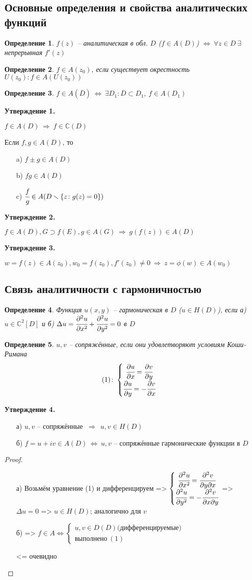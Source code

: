 \documentclass[draft]{report}
\newcommand{\dd}{\partial}
\newcommand{\then}{\ \Rightarrow\ }
\renewcommand{\C}{\mathbb{C}}
\newcommand{\LRA}{\Leftrightarrow}
\renewcommand{\bar}{\overline}
\renewcommand{\f}{\phi}
\newcommand{\D}{\Delta}
\newcommand{\sys}[1]{\left\{\begin{matrix}#1\end{matrix}\right.}
\newcommand{\opr}[1]{\begin{opred}#1\end{opred}}
\newtheorem*{opred}{Определение}
\theoremstyle{remark}
\begin{document}
\subsection{Основные определения и свойства аналитических функций}

\opr{$f(z)$ -- аналитическая в обл. $D$ ($f\in A(D)$) $\LRA\ \forall z\in D\ \exists$ непрерывная $f'(z)$ }
\opr{$f\in A(z_0)$, если существует окрестность $U(z_0)\colon f\in A(U(z_0))$}
\opr{$f\in A(\bar{D})\ \LRA\ \exists D_1\colon \bar{D}\subset D_1,\ f\in A(D_1)$}

{\bfseries Утверждение 1.}

$f\in A(D)\then f\in \C(D)$

Если $f,g\in A(D)$, то
\begin{itemize}
\item[a)] $f\pm g\in A(D)$
\item[b)] $fg \in A(D)$
\item[c)] $\cfrac fg \in A(D\smallsetminus\{z\colon g(z)=0\})$
\end{itemize}

{\bfseries Утверждение 2.}

$f\in A(D), G\supset f(E), g\in A(G)\then g(f(z))\in A(D)$

{\bfseries Утверждение 3.}

$w=f(z)\in A(z_0), w_0=f(z_0), f'(z_0)\neq 0 \then z=\f(w)\in A(w_0)$

\subsection{Связь аналитичности с гармоничностью}

\opr{Функция $u(x,y)$ -- гармоническая в $D$ ($u\in H(D)$), если а) $u\in\C^2[D]$ и б) $\D u=\cfrac{\dd^2u}{\dd x^2}+\cfrac{\dd^2u}{\dd y^2}=0$ в $D$}

\opr{$u,v$ -- сопряжённые, если они удовлетворяют условиям Коши-Римана $$(1)\colon\sys{\cfrac{\dd u}{\dd x}=\cfrac{\dd v}{\dd y} \\ \cfrac{\dd u}{\dd y}=-\cfrac{\dd v}{\dd x}}$$}

{\bfseries Утверждение 4.}
\begin{itemize}
\item[а)] $u,v$ -- сопряжённые $\then\ u,v\in H(D)$
\item[б)] $f=u+iv\in A(D)\ \LRA\ u,v$ -- сопряжённые гармонические функции в $D$
\end{itemize}

\begin{proof}
\begin{itemize}
\item[а)] Возьмём уравнение (1) и дифференцируем =>
$\sys{\cfrac{\dd^2u}{\dd x^2}=\cfrac{\dd^2v}{\dd y\dd x} \\ \cfrac{\dd^2u}{\dd y^2}=-\cfrac{\dd^2v}{\dd x\dd y}}$
 => $\D u=0$ => $u\in H(D)$; аналогично для $v$
\item[б)] => $f\in A\LRA \sys{u,v\in D(D) \mbox{(дифференцируемые)} \\ \mbox{выполнено}\ (1)}$

<= очевидно
\end{itemize}
\end{proof}
\end{document}
